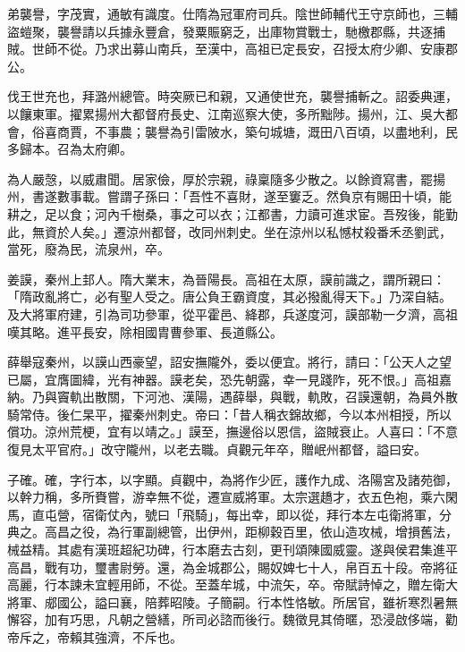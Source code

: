 \begin{pinyinscope}
 弟襲譽，字茂實，通敏有識度。仕隋為冠軍府司兵。陰世師輔代王守京師也，三輔盜螘聚，襲譽請以兵據永豐倉，發粟賑窮乏，出庫物賞戰士，馳檄郡縣，共逐捕賊。世師不從。乃求出募山南兵，至漢中，高祖已定長安，召授太府少卿、安康郡公。



 伐王世充也，拜潞州總管。時突厥已和親，又通使世充，襲譽捕斬之。詔委典運，以饟東軍。擢累揚州大都督府長史、江南巡察大使，多所黜陟。揚州，江、吳大都會，俗喜商賈，不事農；襲譽為引雷陂水，築句城塘，溉田八百頃，以盡地利，民多歸本。召為太府卿。



 為人嚴愨，以威肅聞。居家儉，厚於宗親，祿稟隨多少散之。以餘資寫書，罷揚州，書遂數事載。嘗謂子孫曰：「吾性不喜財，遂至窶乏。然負京有賜田十頃，能耕之，足以食；河內千樹桑，事之可以衣；江都書，力讀可進求宦。吾歿後，能勤此，無資於人矣。」遷涼州都督，改同州刺史。坐在涼州以私憾杖殺番禾丞劉武，當死，廢為民，流泉州，卒。



 姜謨，秦州上邽人。隋大業末，為晉陽長。高祖在太原，謨前識之，謂所親曰：「隋政亂將亡，必有聖人受之。唐公負王霸資度，其必撥亂得天下。」乃深自結。及大將軍府建，引為司功參軍，從平霍邑、絳郡，兵遂度河，謨部勒一夕濟，高祖嘆其略。進平長安，除相國胄曹參軍、長道縣公。



 薛舉寇秦州，以謨山西豪望，詔安撫隴外，委以便宜。將行，請曰：「公天人之望已屬，宜膺圖緯，光有神器。謨老矣，恐先朝露，幸一見踐阼，死不恨。」高祖嘉納。乃與竇軌出散關，下河池、漢陽，遇薛舉，與戰，軌敗，召謨還朝，為員外散騎常侍。後仁杲平，擢秦州刺史。帝曰：「昔人稱衣錦故鄉，今以本州相授，所以償功。涼州荒梗，宜有以靖之。」謨至，撫邊俗以恩信，盜賊衰止。人喜曰：「不意復見太平官府。」改守隴州，以老去職。貞觀元年卒，贈岷州都督，謚曰安。



 子確。確，字行本，以字顯。貞觀中，為將作少匠，護作九成、洛陽宮及諸苑御，以幹力稱，多所賚嘗，游幸無不從，遷宣威將軍。太宗選趫才，衣五色袍，乘六閑馬，直屯營，宿衛仗內，號曰「飛騎」，每出幸，即以從，拜行本左屯衛將軍，分典之。高昌之役，為行軍副總管，出伊州，距柳穀百里，依山造攻械，增損舊法，械益精。其處有漢班超紀功碑，行本磨去古刻，更刊頌陳國威靈。遂與侯君集進平高昌，戰有功，璽書尉勞。還，為金城郡公，賜奴婢七十人，帛百五十段。帝將征高麗，行本諫未宜輕用師，不從。至蓋牟城，中流矢，卒。帝賦詩悼之，贈左衛大將軍、郕國公，謚曰襄，陪葬昭陵。子簡嗣。行本性恪敏。所居官，雖祈寒烈暑無懈容，加有巧思，凡朝之營繕，所司必諮而後行。魏徵見其倚暱，恐浸啟侈端，勸帝斥之，帝賴其強濟，不斥也。




\end{pinyinscope}
